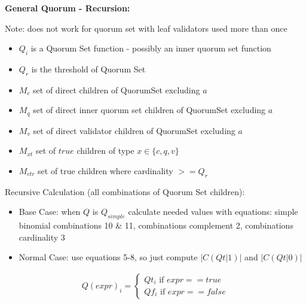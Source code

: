 \documentclass[10pt]{article}
\begin{document}
\newcommand{\powerset}[1]{\mathbb{P}(#1)}
\newcommand{\cardinality}[1]{\left\vert{#1}\right\vert}

\newcommand{\tgt}[0]{ \cardinality{ C(Qt|1) } }
\newcommand{\tgf}[0]{ \cardinality{ C(Qt|0) } }
\newcommand{\fgt}[0]{ \cardinality{ C(Qf|1) } }
\newcommand{\fgf}[0]{ \cardinality{ C(Qf|0) } }
\newcommand{\effected}[0]{ \tgt + \fgf - 2^m }

\setcounter{equation}{15}



\textbf{General Quorum - Recursion:}\\\par
Note: does not work for quorum set with leaf validators used more than once

\begin{itemize}
  \item $Q_i$ is a Quorum Set function - possibly an inner quorum set function
  \item $Q_{r}$ is the threshold of Quorum Set
  \item $M_{c}$ set of direct children of QuorumSet excluding $a$
  \item $M_{q}$ set of direct inner quorum set children of QuorumSet excluding $a$
  \item $M_{v}$ set of direct validator children of QuorumSet excluding $a$
  \item $M_{xt}$ set of $true$ children of type $x \in \{c,q,v\}$
  \item $M_{ctr}$ set of true children where cardinality $>=Q_r$
\end{itemize}



Recursive Calculation (all combinations of Quorum Set children):
\begin{itemize}
  \item Base Case: when $Q$ is $Q_{simple}$ calculate needed values with equations:
    simple binomial combinations 10 \& 11,
    combinations complement 2,
    combinations cardinality 3
  \item Normal Case: use equations 5-8, so just compute
    $\cardinality{C(Qt|1)}$ and $\cardinality{C(Qt|0)}$
\end{itemize}


\begin{align}
  Q(expr)_i =
  \begin{cases}
    Qt_i \text{ if } expr==true \\
    Qf_i \text{ if } expr==false
  \end{cases}
\end{align}
\end{document}
